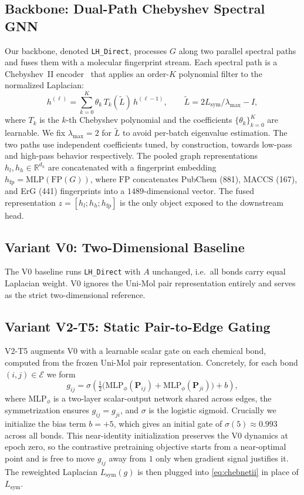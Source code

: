 \documentclass[conference]{IEEEtran}
\begin{document}
\subsection{Backbone: Dual-Path Chebyshev Spectral GNN}
Our backbone, denoted \texttt{LH\_Direct}, processes $G$ along two parallel spectral paths and fuses them with a molecular fingerprint stream. Each spectral path is a Chebyshev~II encoder~\cite{he2022chebnetii} that applies an order-$K$ polynomial filter to the normalized Laplacian:
\begin{equation}
    h^{(\ell)} = \sum_{k=0}^{K} \theta_k\, T_k(\tilde L)\, h^{(\ell-1)},
    \qquad \tilde L = 2L_{\mathrm{sym}}/\lambda_{\max} - I,
    \label{eq:chebnetii}
\end{equation}
where $T_k$ is the $k$-th Chebyshev polynomial and the coefficients $\{\theta_k\}_{k=0}^{K}$ are learnable. We fix $\lambda_{\max}{=}2$ for $\tilde L$ to avoid per-batch eigenvalue estimation. The two paths use independent coefficients tuned, by construction, towards low-pass and high-pass behavior respectively. The pooled graph representations $h_l, h_h\in\mathbb{R}^{d_h}$ are concatenated with a fingerprint embedding $h_{\mathrm{fp}}=\mathrm{MLP}(\mathrm{FP}(G))$, where $\mathrm{FP}$ concatenates PubChem (881), MACCS (167), and ErG (441) fingerprints into a $1489$-dimensional vector. The fused representation $z = [h_l; h_h; h_{\mathrm{fp}}]$ is the only object exposed to the downstream head.

\subsection{Variant V0: Two-Dimensional Baseline}
The V0 baseline runs \texttt{LH\_Direct} with $A$ unchanged, i.e.\ all bonds carry equal Laplacian weight. V0 ignores the Uni-Mol pair representation entirely and serves as the strict two-dimensional reference.

\subsection{Variant V2-T5: Static Pair-to-Edge Gating}
\label{sec:v2t5}
V2-T5 augments V0 with a learnable scalar gate on each chemical bond, computed from the frozen Uni-Mol pair representation. Concretely, for each bond $(i,j)\in\mathcal{E}$ we form
\begin{equation}
    g_{ij} = \sigma\!\left( \tfrac{1}{2}\bigl(\mathrm{MLP}_\phi(\mathbf{P}_{ij}) + \mathrm{MLP}_\phi(\mathbf{P}_{ji})\bigr) + b \right),
    \label{eq:v2t5gate}
\end{equation}
where $\mathrm{MLP}_\phi$ is a two-layer scalar-output network shared across edges, the symmetrization ensures $g_{ij}=g_{ji}$, and $\sigma$ is the logistic sigmoid. Crucially we initialize the bias term $b=+5$, which gives an initial gate of $\sigma(5)\approx 0.993$ across all bonds. This near-identity initialization preserves the V0 dynamics at epoch zero, so the contrastive pretraining objective starts from a near-optimal point and is free to move $g_{ij}$ away from $1$ only when gradient signal justifies it. The reweighted Laplacian $L_{\mathrm{sym}}(g)$ is then plugged into \eqref{eq:chebnetii} in place of $L_{\mathrm{sym}}$.
\end{document}
